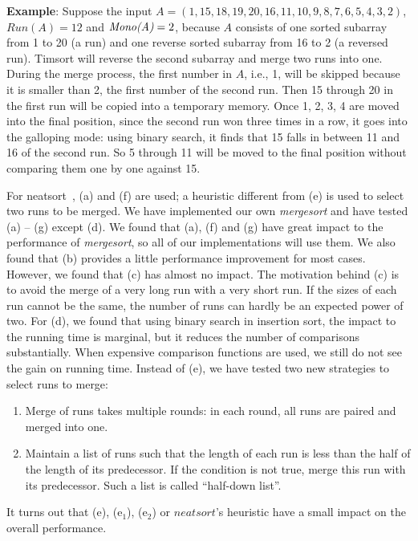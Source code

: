 \documentclass[AMA,STIX1COL]{WileyNJD-v2}
\newcommand {\mono}{\emph{Mono(A)}}
\newcommand{\msort}{\emph{mergesort }}
\newcommand{\msortn}{\emph{mergesort}}
\begin{document}
\textbf{Example}: Suppose the input $A = (1, 15, 18, 19, 20, 16, 11, 10, 9, 8, 7, 6, 5, 4, 3, 2)$, $Run(A) = 12$ and $\mono = 2$, because $A$ consists of one sorted subarray from 1 to 20 (a run) and one reverse sorted subarray from 16 to 2 (a reversed run).
Timsort will reverse the second subarray and merge two runs into one. 
During the merge process, the first number in $A$, i.e., 1, will be skipped because it is smaller than 2, the first number of the second run. 
Then 15 through 20 in the first run will be copied into a temporary memory. 
Once 1, 2, 3, 4 are moved into the final position, since the second run won three times in a row,  it goes into the galloping mode: using binary search, it finds that 15 falls in between 11 and 16 of the second run. 
So 5 through 11 will be moved to the final position without comparing them one by one against 15. 

For neatsort~\cite{la2014neatsort}, (a) and (f) are used; a heuristic different from (e) is used to select two runs to be merged. 
We have implemented our own \msort and have tested (a) – (g) except (d). We found that (a), (f) and (g) have great impact to the performance of \msortn, so all of our implementations will use them. 
We also found that (b) provides a little performance improvement for most cases. 
However, we found that (c) has almost no impact. 
The motivation behind (c) is to avoid the merge of a very long run with a very short run. 
If the sizes of each run cannot be the same, the number of runs can hardly be an expected power of two. 
For (d), we found that using binary search in insertion sort, the impact to the running time is marginal, but it reduces the number of comparisons substantially. 
When expensive comparison functions are used, we still do not see the gain on running time. Instead of (e), we have tested two new strategies to select runs to merge:
\begin{enumerate}[(e$_1$)]
\item Merge of runs takes multiple rounds: in each round, all runs are paired and merged into one.
\item Maintain a list of runs such that the length of each run is less than the half of the length of its predecessor. If the condition is not true, merge this run with its predecessor. Such a list is called “half-down list”.
\end{enumerate}

It turns out that (e), (e$_1$), (e$_2$) or $neatsort$’s heuristic have a small impact on the overall performance.
\end{document}
